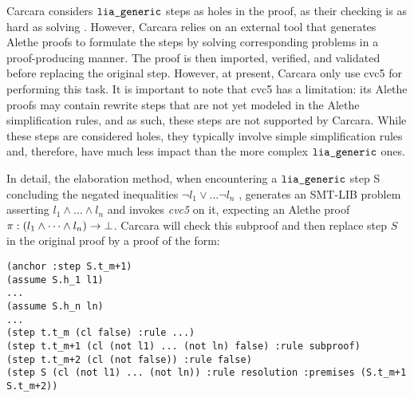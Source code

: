 Carcara considers $\tt{lia\_generic}$ steps as holes in the proof,  as their checking is as hard as solving \cite[\S 3.2]{carcara}.
However, Carcara relies on an external tool that generates Alethe proofs to formulate the steps by solving corresponding problems in a proof-producing manner.
The proof is then imported, verified, and validated before replacing the original step.
However, at present, Carcara only use cvc5 for performing this task.
It is important to note that cvc5 has a limitation: its Alethe proofs may contain rewrite steps that are not yet modeled in the Alethe simplification rules, and as such, these steps are not supported by Carcara.
While these steps are considered holes, they typically involve simple simplification rules and, therefore, have much less impact than the more complex $\tt{lia\_generic}$ ones.

In detail, the elaboration method, when encountering a $\tt{lia\_generic}$ step S concluding the negated inequalities $ \neg l_1 \lor \dots \neg l_n$ , generates an SMT-LIB problem asserting $l_1 \land \dots \land l_n$ and invokes \emph{cvc5} on it, expecting an Alethe proof $\pi : (l_1 \land \dots \land l_n) \ra \bot$.
Carcara will check this subproof and then replace step $S$ in the original proof by a proof of the form:
\begin{lstlisting}[language=SMT,caption={Elaboration of $\tt{lia\_generic}$},label={lst:elab_lia}]
(anchor :step S.t_m+1)
(assume S.h_1 l1)
...
(assume S.h_n ln)
...
(step t.t_m (cl false) :rule ...)
(step t.t_m+1 (cl (not l1) ... (not ln) false) :rule subproof)
(step t.t_m+2 (cl (not false)) :rule false)
(step S (cl (not l1) ... (not ln)) :rule resolution :premises (S.t_m+1 S.t_m+2))
\end{lstlisting}

